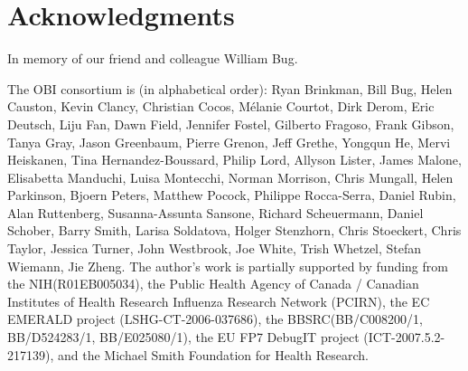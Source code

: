 \documentclass[jou]{ao2e}%
\begin{document}

\section*{Acknowledgments}

In memory of our friend and colleague William Bug. 

The OBI consortium is (in alphabetical order): Ryan Brinkman, Bill Bug, Helen Causton, Kevin Clancy, Christian Cocos, M\'elanie Courtot, Dirk Derom, Eric Deutsch, Liju Fan, Dawn Field, Jennifer Fostel, Gilberto Fragoso, Frank Gibson, Tanya Gray, Jason Greenbaum, Pierre Grenon, Jeff Grethe, Yongqun He, Mervi Heiskanen, Tina Hernandez-Boussard, Philip Lord, Allyson Lister, James Malone, Elisabetta Manduchi, Luisa Montecchi, Norman Morrison, Chris Mungall, Helen Parkinson, Bjoern Peters, Matthew Pocock, Philippe Rocca-Serra, Daniel Rubin, Alan Ruttenberg, Susanna-Assunta Sansone, Richard Scheuermann, Daniel Schober, Barry Smith, Larisa Soldatova, Holger Stenzhorn, Chris Stoeckert, Chris Taylor, Jessica Turner, John Westbrook,  Joe White, Trish Whetzel, Stefan Wiemann, Jie Zheng. 
The author's work is partially supported by funding from the NIH(R01EB005034),  the Public Health Agency of Canada / Canadian Institutes of Health Research Influenza Research Network (PCIRN), the EC EMERALD project (LSHG-CT-2006-037686), the BBSRC(BB/C008200/1, BB/D524283/1, BB/E025080/1), the EU FP7 DebugIT project (ICT-2007.5.2-217139), and the Michael Smith Foundation for Health Research.


%
\end{document}

